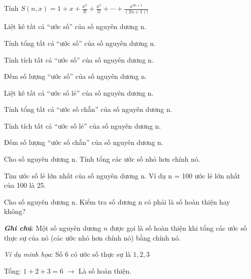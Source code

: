 \begin{problem}
    Tính $S(n,x) = 1 + x + \frac{x^3}{3!} + \frac{x^5}{5!} + \cdots + \frac{x^{2n+1}}{(2n+1)!}$
\end{problem}

\begin{problem}
    Liệt kê tất cả “ước số” của số nguyên dương n.
\end{problem}
\begin{problem}
    Tính tổng tất cả “ước số” của số nguyên dương n.
\end{problem}
\begin{problem}
    Tính tích tất cả “ước số” của số nguyên dương n.
\end{problem}
\begin{problem}
    Đếm số lượng “ước số” của số nguyên dương n.
\end{problem}

\begin{problem}
    Liệt kê tất cả “ước số lẻ” của số nguyên dương n.
\end{problem}

\begin{problem}
    Tính tổng tất cả “ước số chẵn” của số nguyên dương n.
\end{problem}

\begin{problem}
    Tính tích tất cả “ước số lẻ” của số nguyên dương n.
\end{problem}

\begin{problem}
    Đếm số lượng “ước số chẵn” của số nguyên dương n.
\end{problem}

\begin{problem}
    Cho số nguyên dương n. Tính tổng các ước số nhỏ hơn chính nó.
\end{problem}

\begin{problem}
    Tìm ước số lẻ lớn nhất của số nguyên dương n. Ví dụ n = 100 ước lẻ
lớn nhất của 100 là 25.
\end{problem}

\begin{problem}
    Cho số nguyên dương n. Kiểm tra số dương n có phải là số hoàn thiện hay không?


    \textbf{\textit{Ghi chú}}: Một số nguyên dương $n$ được gọi là số hoàn thiện khi tổng các ước số thực sự của nó (các ước nhỏ hơn chính nó) bằng chính nó.

    \textit{Ví dụ minh họa}: Số 6 có ước số thực sự là $1, 2, 3$

    Tổng: $1 + 2 + 3 = 6$ $\rightarrow$ Là số hoàn thiện.
\end{problem}

